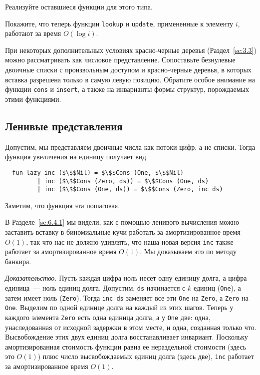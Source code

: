 \begin{exercise}\label{ex:9.5}
  Реализуйте оставшиеся функции для этого типа.
\end{exercise}

\begin{exercise}\label{ex:9.6}
  Покажите, что теперь функции \lstinline!lookup! и
  \lstinline!update!, примененные к элементу $i$, работают за время
  $O(\log i)$.
\end{exercise}

\begin{exercise}\label{ex:9.7}
  При некоторых дополнительных условиях красно-черные деревья
  (Раздел~\ref{sc:3.3}) можно рассматривать как числовое
  представление. Сопоставьте безнулевые двоичные списки с произвольным
  доступом и красно-черные деревья, в которых вставка разрешена только
  в самую левую позицию. Обратите особое внимание на функции
  \lstinline!cons! и \lstinline!insert!, а также на инварианты формы
  структур, порождаемых этими функциями.
\end{exercise}

\subsection{Ленивые представления}
\label{sc:9.2.3}

Допустим, мы представляем двоичные числа как потоки цифр, а не
списки. Тогда функция увеличения на единицу получает вид
\begin{lstlisting}
  fun lazy inc ($\$$Nil) = $\$$Cons (One, $\$$Nil)
         | inc ($\$$Cons (Zero, ds)) = $\$$Cons (One, ds)
         | inc ($\$$Cons (One, ds)) = $\$$Cons (Zero, inc ds)
\end{lstlisting}
Заметим, что функция эта пошаговая.

В Разделе~\ref{sc:6.4.1} мы видели, как с помощью ленивого вычисления
можно заставить вставку в биномиальные кучи работать за
амортизированное время $O(1)$, так что нас не должно удивлять, что
наша новая версия \lstinline!inc! также работает за амортизированное
время $O(1)$. Мы доказываем это по методу банкира.

\emph{Доказательство.} Пусть каждая цифра ноль несет одну единицу долга, а
цифра единица~--- ноль единиц долга. Допустим, \lstinline!ds!
начинается с $k$ единиц (\lstinline!One!), а затем имеет ноль
(\lstinline!Zero!). Тогда \lstinline!inc ds! заменяет все эти \lstinline!One!
на \lstinline!Zero!, а \lstinline!Zero! на \lstinline!One!. 
Выделим по одной единице долга на каждый
из этих шагов. Теперь у каждого элемента \lstinline!Zero! есть одна
единица долга, а у \lstinline!One! две: одна, унаследованная от
исходной задержки в этом месте, и одна, созданная только
что. Высвобождение этих двух единиц долга восстанавливает
инвариант. Поскольку амортизированная стоимость функции равна ее
нераздельной стоимости (здесь это $O(1)$) плюс число высвобождаемых
единиц долга (здесь две), \lstinline!inc! работает за амортизированное
время $O(1)$.

